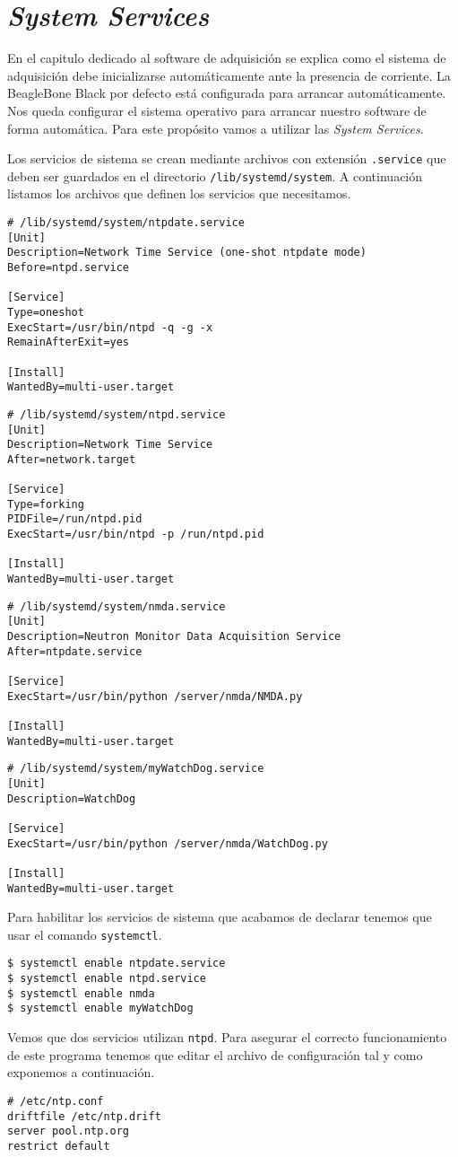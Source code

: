 	\section{\emph{System Services}}
		\label{appendix:systemctl}
		En el capitulo dedicado al software de adquisición se explica como el sistema de adquisición debe inicializarse automáticamente ante
		la presencia de corriente. La BeagleBone Black por defecto está configurada para arrancar automáticamente. Nos queda configurar el
		sistema operativo para arrancar nuestro software de forma automática. Para este propósito vamos a utilizar las \emph{System Services}. 
		\par
		Los servicios de sistema se crean mediante archivos con extensión \texttt{.service} que deben ser guardados en el directorio
		\texttt{/lib/systemd/system}. A continuación listamos los archivos que definen los servicios que necesitamos.
		\begin{lstlisting}[style=myFile]
# /lib/systemd/system/ntpdate.service
[Unit]
Description=Network Time Service (one-shot ntpdate mode)
Before=ntpd.service

[Service]
Type=oneshot
ExecStart=/usr/bin/ntpd -q -g -x
RemainAfterExit=yes

[Install]
WantedBy=multi-user.target
		\end{lstlisting}
		\begin{lstlisting}[style=myFile]
# /lib/systemd/system/ntpd.service
[Unit]
Description=Network Time Service
After=network.target

[Service]
Type=forking
PIDFile=/run/ntpd.pid
ExecStart=/usr/bin/ntpd -p /run/ntpd.pid

[Install]
WantedBy=multi-user.target
		\end{lstlisting}
		\begin{lstlisting}[style=myFile]
# /lib/systemd/system/nmda.service
[Unit]
Description=Neutron Monitor Data Acquisition Service
After=ntpdate.service

[Service]
ExecStart=/usr/bin/python /server/nmda/NMDA.py

[Install]
WantedBy=multi-user.target
		\end{lstlisting}
		\begin{lstlisting}[style=myFile]
# /lib/systemd/system/myWatchDog.service         
[Unit]
Description=WatchDog

[Service]
ExecStart=/usr/bin/python /server/nmda/WatchDog.py

[Install]
WantedBy=multi-user.target
		\end{lstlisting}
		Para habilitar los servicios de sistema que acabamos de declarar tenemos que usar el comando \texttt{systemctl}.
		\begin{lstlisting}[style=myBash]
$ systemctl enable ntpdate.service
$ systemctl enable ntpd.service
$ systemctl enable nmda
$ systemctl enable myWatchDog
		\end{lstlisting}
		Vemos que dos servicios utilizan \texttt{ntpd}. Para asegurar el correcto funcionamiento de este programa tenemos que editar el
		archivo de configuración tal y como exponemos a continuación.
		\begin{lstlisting}[style=myFile]
# /etc/ntp.conf
driftfile /etc/ntp.drift
server pool.ntp.org
restrict default
		\end{lstlisting}
